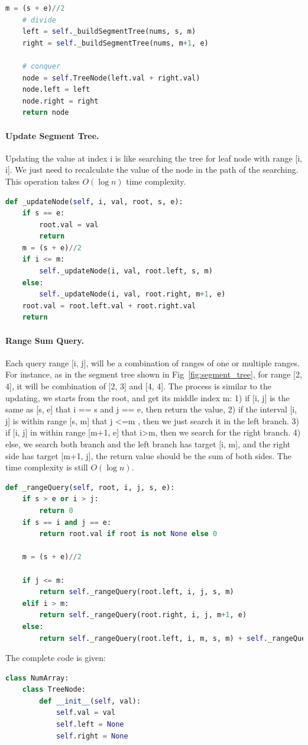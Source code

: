 \documentclass[../main.tex]{subfiles}
\begin{document}
\begin{examples}[resume]
\begin{lstlisting}[language=Python]
    m = (s + e)//2
    # divide 
    left = self._buildSegmentTree(nums, s, m)
    right = self._buildSegmentTree(nums, m+1, e)
    
    # conquer
    node = self.TreeNode(left.val + right.val)
    node.left = left
    node.right = right
    return node
\end{lstlisting}
\paragraph{Update Segment Tree.} Updating the value at index i is like searching the tree for leaf node with range [i, i]. We just need to recalculate the value of the node in the path of the searching. This operation takes $O(\log n)$ time complexity. 
\begin{lstlisting}[language=Python]
def _updateNode(self, i, val, root, s, e):
    if s == e:
        root.val = val
        return 
    m = (s + e)//2
    if i <= m:
        self._updateNode(i, val, root.left, s, m)
    else:
        self._updateNode(i, val, root.right, m+1, e)
    root.val = root.left.val + root.right.val
    return
\end{lstlisting}
\paragraph{Range Sum Query.} Each query range [i, j], will be a combination of ranges of one or multiple ranges. For instance, as in the segment tree  shown in Fig~\ref{fig:segment_tree}, for range [2, 4], it will be combination of [2, 3] and [4, 4]. The process is similar to the updating, we starts from the root, and get its middle index m: 1) if [i, j] is the same as [s, e] that i == s and j == e, then return the value, 2) if the interval [i, j] is within range [s, m] that j <=m , then we just search it in the left branch. 3) if [i, j] in within range [m+1, e] that i>m, then we search for the right branch. 4) else, we search both branch and the left branch has target [i, m], and the right side has target [m+1, j], the return value should be the sum of both sides.  The time complexity is still $O(\log n)$. 
\begin{lstlisting}[language=Python]
def _rangeQuery(self, root, i, j, s, e): 
    if s > e or i > j:
        return 0
    if s == i and j == e:
        return root.val if root is not None else 0
    
    m = (s + e)//2

    if j <= m:
        return self._rangeQuery(root.left, i, j, s, m)
    elif i > m:
        return self._rangeQuery(root.right, i, j, m+1, e)
    else:
        return self._rangeQuery(root.left, i, m, s, m) + self._rangeQuery(root.right, m+1, j, m+1, e)
\end{lstlisting}
The complete code is given: 
\begin{lstlisting}[language=Python]
class NumArray:
    class TreeNode:
        def __init__(self, val):
            self.val = val
            self.left = None
            self.right = None


\end{lstlisting}
\end{examples}
\end{document}
